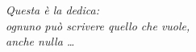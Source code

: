 \begin{titlepage} 
\thispagestyle{empty}           %
\topmargin=6.5cm                %
\raggedleft                     %
\large                          %
\em                             %
Questa è la dedica:\\
ognuno può scrivere quello che vuole, \\
anche nulla \ldots                      %
\newpage                                %
%
\blankpage
\end{titlepage}

